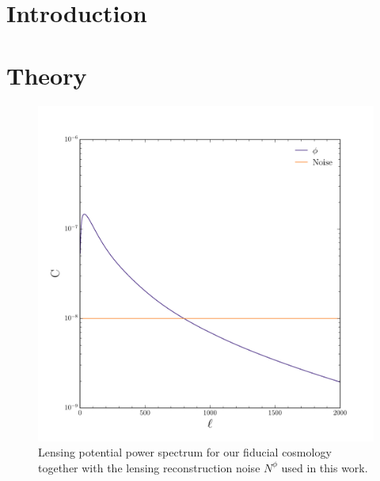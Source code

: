 \documentclass[aps,prl,preprint,groupedaddress]{revtex4-1}
\begin{document}
\section{Introduction}


\subsection{}
\subsubsection{}

\section{Theory}

\begin{figure}[htbp]
\begin{center}
\includegraphics[scale=0.6]{PS_phi_with_noise.pdf}
\caption{Lensing potential power spectrum for our fiducial cosmology together with the lensing reconstruction noise $N^{\phi}$ used in this work.}
\label{fig:phi-cl-noise}
\end{center}
\end{figure}
\end{document}
